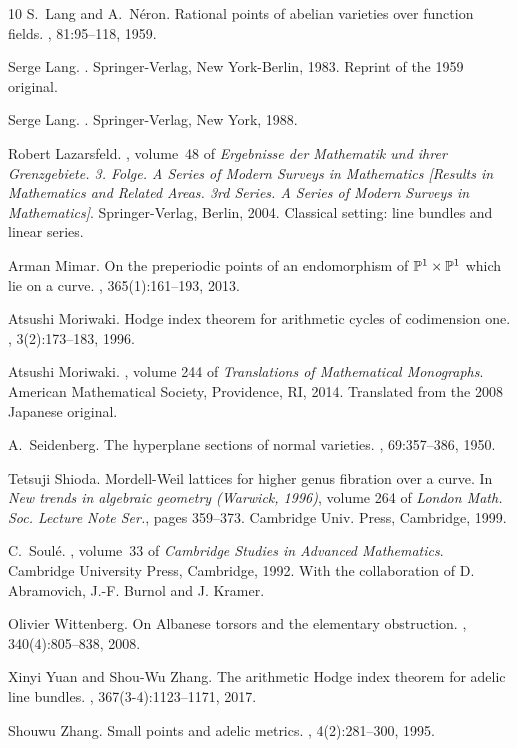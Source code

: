 \documentclass[times, doublespace]{amsart}
\numberwithin{equation}{section}
\theoremstyle{plain}
\theoremstyle{definition}
\begin{document}
\begin{thebibliography}{10}
S.~Lang and A.~N\'{e}ron.
\newblock Rational points of abelian varieties over function fields.
, 81:95--118, 1959.

Serge Lang.
.
\newblock Springer-Verlag, New York-Berlin, 1983.
\newblock Reprint of the 1959 original.

Serge Lang.
.
\newblock Springer-Verlag, New York, 1988.

Robert Lazarsfeld.
, volume~48 of {\em
  Ergebnisse der Mathematik und ihrer Grenzgebiete. 3. Folge. A Series of
  Modern Surveys in Mathematics [Results in Mathematics and Related Areas. 3rd
  Series. A Series of Modern Surveys in Mathematics]}.
\newblock Springer-Verlag, Berlin, 2004.
\newblock Classical setting: line bundles and linear series.

Arman Mimar.
\newblock On the preperiodic points of an endomorphism of
  {$\Bbb{P}^1\times\Bbb{P}^1$} which lie on a curve.
, 365(1):161--193, 2013.

Atsushi Moriwaki.
\newblock Hodge index theorem for arithmetic cycles of codimension one.
, 3(2):173--183, 1996.

Atsushi Moriwaki.
, volume 244 of {\em Translations of
  Mathematical Monographs}.
\newblock American Mathematical Society, Providence, RI, 2014.
\newblock Translated from the 2008 Japanese original.

A.~Seidenberg.
\newblock The hyperplane sections of normal varieties.
, 69:357--386, 1950.

Tetsuji Shioda.
\newblock Mordell-{W}eil lattices for higher genus fibration over a curve.
\newblock In {\em New trends in algebraic geometry ({W}arwick, 1996)}, volume
  264 of {\em London Math. Soc. Lecture Note Ser.}, pages 359--373. Cambridge
  Univ. Press, Cambridge, 1999.

C.~Soul\'{e}.
, volume~33 of {\em Cambridge
  Studies in Advanced Mathematics}.
\newblock Cambridge University Press, Cambridge, 1992.
\newblock With the collaboration of D. Abramovich, J.-F. Burnol and J. Kramer.

Olivier Wittenberg.
\newblock On {A}lbanese torsors and the elementary obstruction.
, 340(4):805--838, 2008.

Xinyi Yuan and Shou-Wu Zhang.
\newblock The arithmetic {H}odge index theorem for adelic line bundles.
, 367(3-4):1123--1171, 2017.

Shouwu Zhang.
\newblock Small points and adelic metrics.
, 4(2):281--300, 1995.

\end{thebibliography}



%
%
\end{document}
